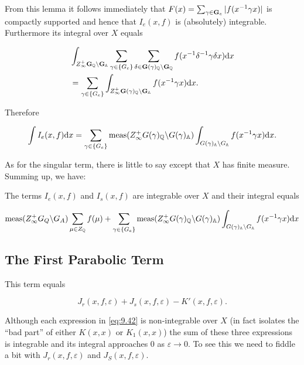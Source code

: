 From this lemma it follows immediately that $F(x) = \sum_{\gamma \in \mathbf{G}_e}|f(x^{-1}\gamma x)|$ is compactly supported and hence that $I_e(x, f)$ is (absolutely) integrable. Furthermore its integral over $X$ equals

\[
\begin{aligned}
&\int_{Z_\infty^{+}\mathbf{G}_{\mathbb{Q}} \backslash \mathbf{G}_{\mathbb{A}}}\sum_{\gamma \in \{G_e\}}\sum_{\delta \in \mathbf{G}(\gamma)_{\mathbb{Q}} \backslash \mathbf{G}_{\mathbb{Q}}} f(x^{-1}\delta^{-1}\gamma\delta x)\mathrm{d} x\\
&= \sum_{\gamma \in \{G_e\}}\int_{Z_\infty^{+}\mathbf{G}(\gamma)_{\mathbb{Q}} \backslash \mathbf{G}_{\mathbb{A}}} f(x^{-1}\gamma x)\mathrm{d} x.
\end{aligned}
\]

Therefore

\[
\int I_e(x, f)\mathrm{d} x = \sum_{\gamma \in \{G_e\}}\operatorname{meas}(Z_\infty^{+}G(\gamma)_{\mathbb{Q}} \backslash G(\gamma)_{\mathbb{A}})\int_{G(\gamma)_{\mathbb{A}} \backslash G_{\mathbb{A}}} f(x^{-1}\gamma x)\mathrm{d} x.
\]

As for the singular term, there is little to say except that $X$ has finite measure. Summing up, we have:

\begin{proposition}\label{prop:9.10}

The terms $I_e(x,f)$ and $I_s(x,f)$ are integrable over $X$ and their integral equals

\[
\operatorname{meas}(Z_\infty^{+}G_Q \backslash G_A)\sum_{\mu \in Z_{\mathbb{Q}}} f(\mu) + \sum_{\gamma \in \{G_e\}}\operatorname{meas}(Z_\infty^{+}G(\gamma)_{\mathbb{Q}} \backslash G(\gamma)_{\mathbb{A}})\int_{G(\gamma)_{\mathbb{A}} \backslash G_{\mathbb{A}}} f(x^{-1}\gamma x)\mathrm{d} x
\]

\end{proposition}

\subsection{The First Parabolic Term}

This term equals

\begin{equation}\label{eq:9.42}
J_r(x, f, \varepsilon) + J_s(x, f, \varepsilon) - K'(x, f, \varepsilon).\tag{9.42}
\end{equation}

Although each expression in \eqref{eq:9.42} is non-integrable over $X$ (in fact isolates the ``bad part'' of either $K(x,x)$ or $K_1(x,x)$) the sum of these three expressions is integrable and its integral approaches 0 as $\varepsilon \to 0$. To see this we need to fiddle a bit with $J_r(x, f, \varepsilon)$ and $J_S(x, f, \varepsilon)$.

